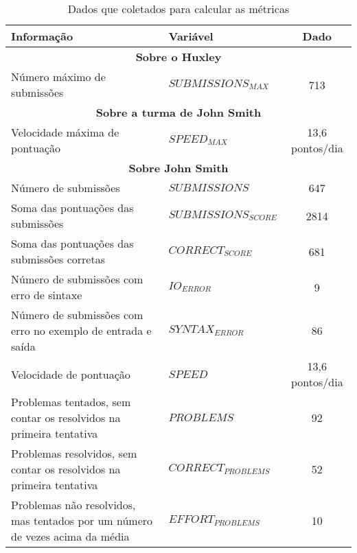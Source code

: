 \begin{table*}[h]
\footnotesize
\caption{\small Dados que coletados para calcular as métricas} 
\addtolength{\tabcolsep}{-3.5pt}
\renewcommand{\arraystretch}{1.5} 
\centering

		\begin{tabular}{|p{9cm}|l|c|}\hline
		
        Informação & Variável & Dado \\\hline\hline
				
				\multicolumn{3}{|c|}{\textbf{Sobre o Huxley}} \\\hline
								
				Número máximo de submissões & $ SUBMISSIONS_{MAX}$	& 713 \\\hline\hline
				
				
				\multicolumn{3}{|c|}{\textbf{Sobre a turma de John Smith}} \\\hline
					
				Velocidade máxima de pontuação &  $ SPEED_{MAX}$ 	& 13,6 pontos/dia \\\hline\hline
				
				
				\multicolumn{3}{|c|}{\textbf{Sobre John Smith}} \\\hline
				
				Número de submissões 												& $ SUBMISSIONS$ & 647		\\\hline
				Soma das pontuações das submissões 					& $ SUBMISSIONS_{SCORE}$ & 2814	\\\hline
				Soma das pontuações das submissões corretas & $ CORRECT_{SCORE}$		 & 681 	\\\hline
				
				Número de submissões com erro de sintaxe											& $ IO_{ERROR}$				& 9 		\\\hline
				Número de submissões com erro no exemplo de entrada e saída		& $ SYNTAX_{ERROR}$		& 86 		\\\hline
				
				Velocidade de pontuação																				& $ SPEED$						& 13,6 pontos/dia 	\\\hline
				
				Problemas tentados,
				sem contar os resolvidos na primeira tentativa				& $ PROBLEMS$ 								& 92		\\\hline
				Problemas resolvidos,
				sem contar os resolvidos na primeira tentativa				& $ CORRECT_{PROBLEMS}$ 			& 52		\\\hline
				Problemas não resolvidos,
				mas tentados por um número de vezes acima da média		& $ EFFORT_{PROBLEMS}$ 				& 10		\\\hline
				

\end{tabular}
\end{table*}

